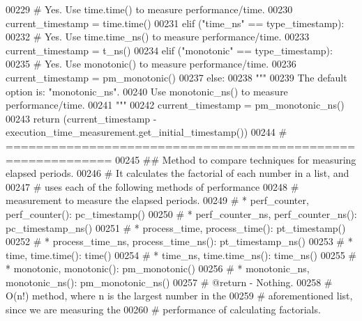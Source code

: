 \begin{DoxyCode}
00229             \textcolor{comment}{# Yes. Use time.time() to measure performance/time.}
00230             current\_timestamp = time.time()
00231         \textcolor{keywordflow}{elif} (\textcolor{stringliteral}{"time\_ns"} == type\_timestamp):
00232             \textcolor{comment}{# Yes. Use time.time\_ns() to measure performance/time.}
00233             current\_timestamp = t\_ns()
00234         \textcolor{keywordflow}{elif} (\textcolor{stringliteral}{"monotonic"} == type\_timestamp):
00235             \textcolor{comment}{# Yes. Use monotonic() to measure performance/time.}
00236             current\_timestamp = pm\_monotonic()
00237         \textcolor{keywordflow}{else}:
00238             \textcolor{stringliteral}{"""}
00239 \textcolor{stringliteral}{                The default option is: "monotonic\_ns".}
00240 \textcolor{stringliteral}{                Use monotonic\_ns() to measure performance/time.}
00241 \textcolor{stringliteral}{            """}
00242             current\_timestamp = pm\_monotonic\_ns()
00243         \textcolor{keywordflow}{return} (current\_timestamp - execution\_time\_measurement.get\_initial\_timestamp())
00244     \textcolor{comment}{# ============================================================}
00245     \textcolor{comment}{##  Method to compare techniques for measuring elapsed periods.}
00246     \textcolor{comment}{#   It calculates the factorial of each number in a list, and}
00247     \textcolor{comment}{#       uses each of the following methods of performance}
00248     \textcolor{comment}{#       measurement to measure the elapsed periods.}
00249     \textcolor{comment}{#       * perf\_counter, perf\_counter(): pc\_timestamp()}
00250     \textcolor{comment}{#       * perf\_counter\_ns, perf\_counter\_ns(): pc\_timestamp\_ns()}
00251     \textcolor{comment}{#       * process\_time, process\_time(): pt\_timestamp()}
00252     \textcolor{comment}{#       * process\_time\_ns, process\_time\_ns(): pt\_timestamp\_ns()}
00253     \textcolor{comment}{#       * time, time.time(): time()}
00254     \textcolor{comment}{#       * time\_ns, time.time\_ns(): time\_ns()}
00255     \textcolor{comment}{#       * monotonic, monotonic(): pm\_monotonic()}
00256     \textcolor{comment}{#       * monotonic\_ns, monotonic\_ns(): pm\_monotonic\_ns()}
00257     \textcolor{comment}{#   @return - Nothing.}
00258     \textcolor{comment}{#   O(n!) method, where n is the largest number in the}
00259     \textcolor{comment}{#       aforementioned list, since we are measuring the}
00260     \textcolor{comment}{#       performance of calculating factorials.}

\end{DoxyCode}
